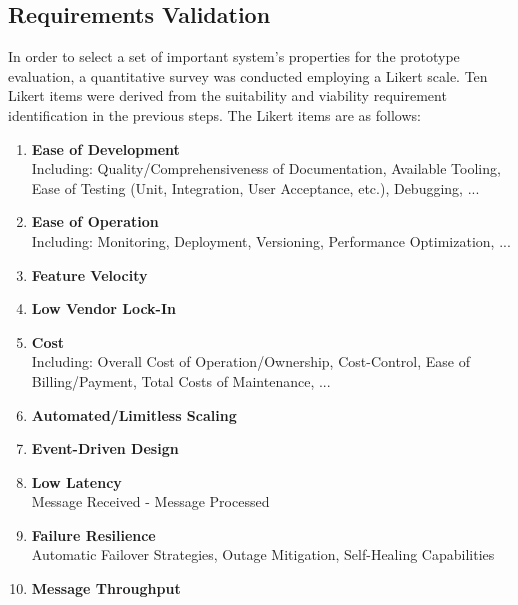 \subsection{Requirements Validation}

In order to select a set of important system's properties for the prototype evaluation, a quantitative survey was conducted employing a Likert scale. Ten Likert items were derived from the suitability and viability requirement identification in the previous steps. The Likert items are as follows:

\begin{enumerate}[nolistsep]
    \item \textbf{Ease of Development}\\
        Including: Quality/Comprehensiveness of Documentation, Available Tooling, Ease of Testing (Unit, Integration, User Acceptance, etc.), Debugging, ...
    \item \textbf{Ease of Operation}\\
        Including: Monitoring, Deployment, Versioning, Performance Optimization, ...
    \item \textbf{Feature Velocity}
    \item \textbf{Low Vendor Lock-In}
    \item \textbf{Cost}\\
        Including: Overall Cost of Operation/Ownership, Cost-Control, Ease of Billing/Payment, Total Costs of Maintenance, ...
    \item \textbf{Automated/Limitless Scaling}
    \item \textbf{Event-Driven Design}
    \item \textbf{Low Latency}\\
         Message Received - Message Processed
    \item \textbf{Failure Resilience}\\
         Automatic Failover Strategies, Outage Mitigation, Self-Healing Capabilities
    \item \textbf{Message Throughput}
\end{enumerate}


